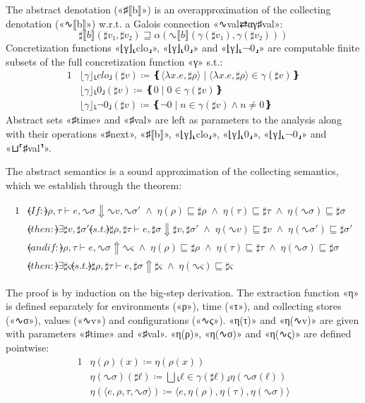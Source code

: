 The abstract denotation («♯{⟦b⟧}») is an overapproximation of the collecting
denotation («∿{⟦b⟧}») w.r.t. a Galois connection «∿{val}⇄{α}{γ}♯{val}»:
\[ ♯{⟦b⟧}(♯{v}₁,♯{v}₂) ⊒ α(∿{⟦b⟧}(γ(♯{v}₁),γ(♯{v}₂))) \]
Concretization functions «⌊γ⌋⸤clo⸥», «⌊γ⌋⸤0⸥» and «⌊γ⌋⸤¬0⸥» are computable
finite subsets of the full concretization function «γ» s.t.:
\begin{alignat*}{1}
  & ⌊γ⌋⸤clo⸥(♯{v}) ≔ ❴⟨λx.e,♯{ρ}⟩ ∣ ⟨λx.e,♯{ρ}⟩ ∈ γ(♯{v})❵ \\
  & ⌊γ⌋⸤0⸥(♯{v}) ≔ ❴0 ∣ 0 ∈ γ(♯{v})❵ \\
  & ⌊γ⌋⸤¬0⸥(♯{v}) ≔ ❴¬0 ∣ n ∈ γ(♯{v}) ∧ n≠0❵
\end{alignat*}
Abstract sets «♯{time}» and «♯{val}» are left as parameters to the analysis
along with their operations «♯{next}», «♯{⟦b⟧}», «⌊γ⌋⸤clo⸥», «⌊γ⌋⸤0⸥»,
«⌊γ⌋⸤¬0⸥» and «⊔⸢♯{val}⸣».

The abstract semantics is a sound approximation of the collecting semantics,
which we establish through the theorem:
\begin{theorem}
  \begin{alignat*}{1}
    & ⦑If:⦒\mathrel{} ρ,τ⊢e,∿{σ}⇓∿{v},∿{σ}′ \;∧\; η(ρ) ⊑ ♯{ρ} \;∧\; η(τ) ⊑ ♯{τ} \;∧\; η(∿{σ}) ⊑ ♯{σ} \\
    & ⦑then:⦒\mathrel{} \mathrel{∃}♯{v},♯{σ}′ \mathrel{⦑s.t.⦒} ♯{ρ},♯{τ}⊢e,♯{σ}⇓♯{v},♯{σ}′ \;∧\; η(∿{v}) ⊑ ♯{v} \;∧\; η(∿{σ}′) ⊑ ♯{σ}′ \\
    & ⦑and if:⦒\mathrel{} ρ,τ⊢e,∿{σ}⇑∿{ς} \;∧\; η(ρ) ⊑ ♯{ρ} \;∧\; η(τ) ⊑ ♯{τ} \;∧\; η(∿{σ}) ⊑ ♯{σ} \\
    & ⦑then:⦒\mathrel{} \mathrel{∃}♯{ς} \mathrel{⦑s.t.⦒} ♯{ρ},♯{τ}⊢e,♯{σ}⇑♯{ς} \;∧\; η(∿{ς}) ⊑ ♯{ς}
  \end{alignat*}
\end{theorem}
The proof is by induction on the big-step derivation. The extraction function
«η» is defined separately for environments («ρ»), time («τ»), and collecting
stores («∿{σ}»), values («∿{v}») and configurations («∿{ς}»). «η(τ)» and
«η(∿{v})» are given with parameters «♯{time}» and «♯{val}». «η(ρ)», «η(∿{σ})»
and «η(∿{ς})» are defined pointwise:
\begin{alignat*}{1}
  & η(ρ)(x) ≔ η(ρ(x)) \\
  & η(∿{σ})(♯{ℓ}) ≔ ⨆⸤ℓ ∈ γ(♯{ℓ})⸥η(∿{σ}(ℓ)) \\
  & η(⟨e,ρ,τ,∿{σ}⟩) ≔ ⟨e,η(ρ),η(τ),η(∿{σ})⟩
\end{alignat*}

